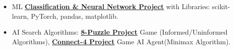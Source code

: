 \begin{itemize}[itemsep=0pt, parsep=0pt, topsep=0pt]
  \item{ \footnotesize ML \textbf{\textcolor{cyan}{\href{https://github.com/AsmaaJAH/Data-classifications-and-Neural-Network-using-random-data}{Classification \& Neural Network Project}}} with Libraries: scikit-learn, PyTorch, pandas, matplotlib. }
  \item {\footnotesize AI Search Algorithms: \textbf{\textcolor{cyan}{\href{https://github.com/AsmaaJAH/8_puzzle}{8-Puzzle Project}}} Game (Informed/Uninformed Algorithms), \textbf{\textcolor{cyan}{\href{https://github.com/AsmaaJAH/Connect-4-AI-Agent}{Connect-4 Project}}} Game AI Agent(Minimax Algorithm).}
 \end{itemize}


